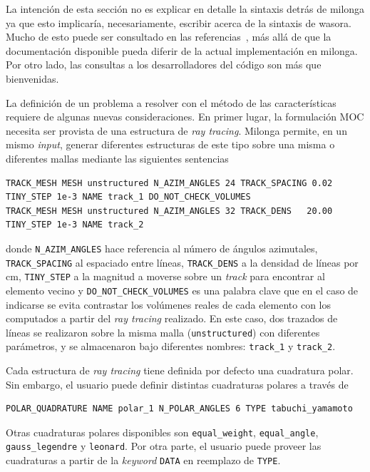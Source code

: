 \documentclass[11pt]{article}
\numberwithin{equation}{section}
\begin{document}
La intenci\'on de esta secci\'on no es explicar en detalle la sintaxis detr\'as de milonga ya que esto implicar\'ia, necesariamente, escribir acerca de la sintaxis de wasora. Mucho de esto puede ser consultado en las referencias~\cite{wasora, milongabase2010, milonga-db, enief-milonga-2014}, m\'as all\'a de que la documentaci\'on disponible pueda diferir de la actual implementación en milonga. Por otro lado, las consultas a los desarrolladores del c\'odigo son m\'as que bienvenidas. 

La definici\'on de un problema a resolver con el m\'etodo de las características requiere de algunas nuevas consideraciones. En primer lugar, la formulación MOC necesita ser provista de una estructura de \emph{ray tracing}. Milonga permite, en un mismo \emph{input}, generar diferentes estructuras de este tipo sobre una misma o diferentes mallas mediante las siguientes sentencias

\begin{lstlisting}[style=wasora]
TRACK_MESH MESH unstructured N_AZIM_ANGLES 24 TRACK_SPACING 0.02 TINY_STEP 1e-3 NAME track_1 DO_NOT_CHECK_VOLUMES
TRACK_MESH MESH unstructured N_AZIM_ANGLES 32 TRACK_DENS   20.00 TINY_STEP 1e-3 NAME track_2
\end{lstlisting}

\noindent
donde \texttt{N_AZIM_ANGLES} hace referencia al n\'umero de \'angulos azimutales, \texttt{TRACK_SPACING} al espaciado entre l\'ineas, \texttt{TRACK_DENS} a la densidad de l\'ineas por \si{\centi\metre}, \texttt{TINY_STEP} a la magnitud a moverse sobre un \emph{track} para encontrar al elemento vecino y \texttt{DO_NOT_CHECK_VOLUMES} es una palabra clave que en el caso de indicarse se evita contrastar los volúmenes reales de cada elemento con los computados a partir del \emph{ray tracing} realizado. En este caso, dos trazados de l\'ineas se realizaron sobre la misma malla (\texttt{unstructured}) con diferentes par\'ametros, y se almacenaron bajo diferentes nombres: \texttt{track_1} y \texttt{track_2}.

Cada estructura de \emph{ray tracing} tiene definida por defecto una cuadratura polar. Sin embargo, el usuario puede definir distintas cuadraturas polares a trav\'es de

\begin{lstlisting}[style=wasora]
POLAR_QUADRATURE NAME polar_1 N_POLAR_ANGLES 6 TYPE tabuchi_yamamoto
\end{lstlisting}

\noindent
Otras cuadraturas polares disponibles son \texttt{equal_weight}, \texttt{equal_angle}, \texttt{gauss_legendre} y \texttt{leonard}. Por otra parte, el usuario puede proveer las cuadraturas a partir de la \emph{keyword} \texttt{DATA} en reemplazo de \texttt{TYPE}.
\end{document}

